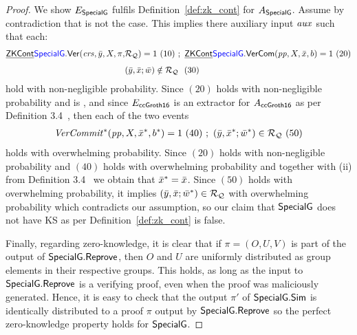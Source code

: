 \begin{proof}
We show $E_{{\mathsf{SpecialG}}}$ fulfils Definition~\ref{def:zk_cont} for $A_{{\mathsf{SpecialG}}}$. Assume by contradiction that is not the case. 
This implies there  auxiliary input $\mathit{aux}$ such that each: 
\begin{align*}
\handan{\ZKCont}{\SpecialG}.\Verify(\crs, \bary, X, \pi, &\relRQ) =1 \ (10)\ ; \ \handan{\ZKCont}{\SpecialG}.\VerifyCom(\pp, X, \barx, b) =1 \ (20) \\
& (\bary, \barx; \baromega) \notin \relRQ  \ \ (30) 
\end{align*}
hold with non-negligible probability. Since $(20)$ holds with non-negligible probability and  is , and since $E_{{\mathsf{ccGroth16}}}$ is an extractor for $A_{{\mathsf{ccGroth16}}}$ as per Definition 3.4~\cite{LegoSNARK},
 then each of the two events 
\begin{align*}
\mathit{VerCommit^*}(\mathit{pp}, X, \bar{x}^*, b^*) =1 \ (40) \ ; \ (\bar{y}, \bar{x}^*; \bar{w}^*) \in  \mathcal{R}_{\mathcal{Q}} \ (50)
\end{align*}
holds with overwhelming probability. Since $(20)$ holds with non-negligible probability and $(40)$ holds with overwhelming probability and 
together with (ii) from Definition 3.4~\cite{LegoSNARK} we obtain that $\bar{x}^* = \bar{x}$. Since $(50)$ holds with overwhelming probability, it implies 
$(\bar{y}, \bar{x}; \bar{w}^*) \in \mathcal{R}_{\mathcal{Q}} $ with overwhelming probability which contradicts our assumption, so our claim that ${\mathsf{SpecialG}}$ does not have 
KS as per Definition~\ref{def:zk_cont} is false. \\



\noindent Finally, regarding zero-knowledge, it is clear that if $\pi = (O, U, V)$ is part of the output of ${\mathsf{SpecialG}}.{\mathsf{Reprove}}$, 
then $O$ and $U$ are uniformly distributed as group elements in their respective groups. This holds, as long as the 
input to ${\mathsf{SpecialG}}.{\mathsf{Reprove}}$ is a verifying proof, even when the proof was maliciously generated. Hence, it is easy to check  
that the output $\pi'$ of ${\mathsf{SpecialG}}.{\mathsf{Sim}}$ is identically distributed to a proof $\pi$ output by ${\mathsf{SpecialG}}.{\mathsf{Reprove}}$ so the perfect 
zero-knowledge property holds for ${\mathsf{SpecialG}}$. 
\end{proof}


